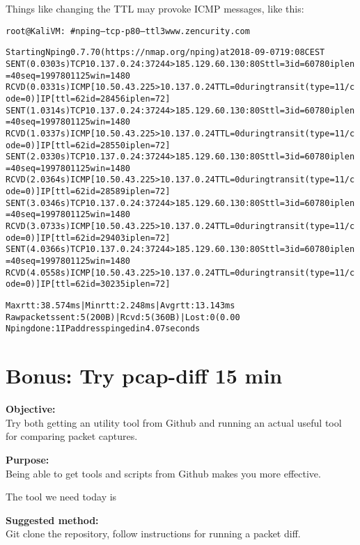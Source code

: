\documentclass[a4paper,11pt,notitlepage]{report}
\begin{document}
\eject
Things like changing the TTL may provoke ICMP messages, like this:
\begin{alltt}\footnotesize
root@KaliVM:~# nping --tcp -p 80 --ttl 3 www.zencurity.com

Starting Nping 0.7.70 ( https://nmap.org/nping ) at 2018-09-07 19:08 CEST
SENT (0.0303s) TCP 10.137.0.24:37244 > 185.129.60.130:80 S ttl=3 id=60780 iplen=40  seq=1997801125 win=1480
RCVD (0.0331s) ICMP [10.50.43.225 > 10.137.0.24 TTL=0 during transit (type=11/code=0) ] IP [ttl=62 id=28456 iplen=72 ]
SENT (1.0314s) TCP 10.137.0.24:37244 > 185.129.60.130:80 S ttl=3 id=60780 iplen=40  seq=1997801125 win=1480
RCVD (1.0337s) ICMP [10.50.43.225 > 10.137.0.24 TTL=0 during transit (type=11/code=0) ] IP [ttl=62 id=28550 iplen=72 ]
SENT (2.0330s) TCP 10.137.0.24:37244 > 185.129.60.130:80 S ttl=3 id=60780 iplen=40  seq=1997801125 win=1480
RCVD (2.0364s) ICMP [10.50.43.225 > 10.137.0.24 TTL=0 during transit (type=11/code=0) ] IP [ttl=62 id=28589 iplen=72 ]
SENT (3.0346s) TCP 10.137.0.24:37244 > 185.129.60.130:80 S ttl=3 id=60780 iplen=40  seq=1997801125 win=1480
RCVD (3.0733s) ICMP [10.50.43.225 > 10.137.0.24 TTL=0 during transit (type=11/code=0) ] IP [ttl=62 id=29403 iplen=72 ]
SENT (4.0366s) TCP 10.137.0.24:37244 > 185.129.60.130:80 S ttl=3 id=60780 iplen=40  seq=1997801125 win=1480
RCVD (4.0558s) ICMP [10.50.43.225 > 10.137.0.24 TTL=0 during transit (type=11/code=0) ] IP [ttl=62 id=30235 iplen=72 ]

Max rtt: 38.574ms | Min rtt: 2.248ms | Avg rtt: 13.143ms
Raw packets sent: 5 (200B) | Rcvd: 5 (360B) | Lost: 0 (0.00%)
Nping done: 1 IP address pinged in 4.07 seconds
\end{alltt}


\chapter{Bonus: Try pcap-diff 15 min}
\label{ex:pcap-diff}

{\bf Objective:}\\
Try both getting an utility tool from Github and running an actual useful tool for comparing packet captures.

{\bf Purpose:}\\
Being able to get tools and scripts from Github makes you more effective.

The tool we need today is 

{\bf Suggested method:}\\
Git clone the repository, follow instructions for running a packet diff.
\end{document}
